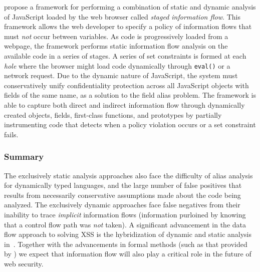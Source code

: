 \documentclass{acmtrans2m}
\begin{document}
 propose a framework for performing a combination of static and dynamic analysis of JavaScript loaded by the web browser called \emph{staged information flow}.
This framework allows the web developer to specify a policy of information flows that must \emph{not} occur between variables.
As code is progressively loaded from a webpage, the framework performs static information flow analysis on the available code in a series of stages.
A series of set constraints is formed at each \emph{hole} where the browser might load code dynamically through \texttt{eval()} or a network request.
Due to the dynamic nature of JavaScript, the system must conservatively unify confidentiality protection across all JavaScript objects with fields of the same name, as a solution to the field alias problem.
The framework is able to capture both direct and indirect information flow through dynamically created objects, fields, first-class functions, and prototypes by partially instrumenting code that detects when a policy violation occurs or a set constraint fails.

\subsubsection*{Summary}
The exclusively static analysis approaches also face the difficulty of alias analysis for dynamically typed languages, and the large number of false positives that results from necessarily conservative assumptions made about the code being analyzed.
The exclusively dynamic approaches face false negatives from their inability to trace \emph{implicit} information flows (information purloined by knowing that a control flow path was \emph{not} taken).
A significant advancement in the data flow approach to solving XSS is the hybridization of dynamic and static analysis in~\cite{stagedflow}.
Together with the advancements in formal methods (such as that provided by ) we expect that information flow will also play a critical role in the future of web security.
\end{document}
